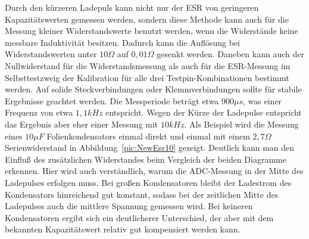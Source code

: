Durch den kürzeren Ladepuls kann nicht nur der ESR von geringeren Kapazitätswerten gemessen werden, sondern
diese Methode kann auch für die Messung kleiner Widerstandswerte benutzt werden, wenn die Widerstände
keine messbare Induktivität besitzen. Dadurch kann die Auflösung bei Widerstandswerten unter \(10 \Omega\) auf 
\(0,01 \Omega\) gesenkt werden. Daneben kann auch der Nullwiderstand für die Widerstandsmessung als auch
für die ESR-Messung im Selbsttestzweig der Kalibration für alle drei Testpin-Kombinationen bestimmt werden.
Auf solide Steckverbindungen oder Klemmverbindungen sollte für stabile Ergebnisse geachtet werden.
Die Messperiode beträgt etwa \(900 \mu s\), was einer Frequenz von etwa \(1,1 kHz\) entspricht.
Wegen der Kürze der Ladepulse entspricht das Ergebnis aber eher einer Messung mit \(10 kHz\).
Als Beispiel wird die Messung eines \(10 \mu F\) Folienkondensators einmal direkt und einmal mit einem
\(2,7 \Omega\) Serienwiderstand in Abbildung~\ref{pic:NewEsr10} gezeigt.
Deutlich kann man den Einfluß des zusätzlichen Widerstandes beim Vergleich der beiden Diagramme erkennen.
Hier wird auch verständlich, warum die ADC-Messung in der Mitte des Ladepulses erfolgen muss.
Bei großen Kondensatoren bleibt der Ladestrom des Kondensators hinreichend gut konstant,
sodass bei der zeitlichen Mitte des Ladepulses auch die mittlere Spannung gemessen wird.
Bei keineren Kondensatoren ergibt sich ein deutlicherer Unterschied, der aber mit dem
bekannten Kapazitätswert relativ gut kompensiert werden kann.

